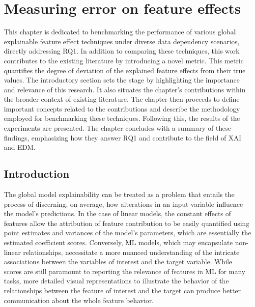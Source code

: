 \chapter{Measuring error on feature effects}
\label{chap:AssALE}

This chapter is dedicated to benchmarking the performance of various global explainable feature effect techniques under diverse data dependency scenarios, directly addressing RQ1. In addition to comparing these techniques, this work contributes to the existing literature by introducing a novel metric. This metric quantifies the degree of deviation of the explained feature effects from their true values. The introductory section sets the stage by highlighting the importance and relevance of this research. It also situates the chapter's contributions within the broader context of existing literature. The chapter then proceeds to define important concepts related to the contributions and describe the methodology employed for benchmarking these techniques. Following this, the results of the experiments are presented. The chapter concludes with a summary of these findings, emphasizing how they answer RQ1 and contribute to the field of XAI and EDM.

\begin{center}
\end{center}


\section{Introduction}

The global model explainability can be treated as a problem that entails the process of discerning, on average, how alterations in an input variable influence the model's predictions. In the case of linear models, the constant effects of features allow the attribution of feature contribution to be easily quantified using point estimates and variances of the model's parameters, which are essentially the estimated coefficient scores\cite{TrevorHastieRobertTibshirani2014AssessmentSelection}. Conversely, ML models, which may encapsulate non-linear relationships, necessitate a more nuanced understanding of the intricate associations between the variables of interest and the target variable. While scores are still paramount to reporting the relevance of features in ML for many tasks, more detailed visual representations to illustrate the behavior of the relationships between the feature of interest and the target can produce better communication about the whole feature behavior.


